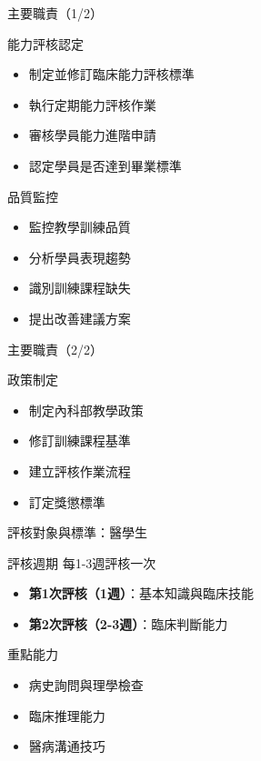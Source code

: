 \documentclass[aspectratio=169,12pt]{beamer}
\begin{document}
\begin{frame}{主要職責（1/2）}
\begin{block}{能力評核認定}
\begin{itemize}
    \item 制定並修訂臨床能力評核標準
    \item 執行定期能力評核作業
    \item 審核學員能力進階申請
    \item 認定學員是否達到畢業標準
\end{itemize}
\end{block}

\begin{block}{品質監控}
\begin{itemize}
    \item 監控教學訓練品質
    \item 分析學員表現趨勢
    \item 識別訓練課程缺失
    \item 提出改善建議方案
\end{itemize}
\end{block}
\end{frame}

\begin{frame}{主要職責（2/2）}
\begin{block}{政策制定}
\begin{itemize}
    \item 制定內科部教學政策
    \item 修訂訓練課程基準
    \item 建立評核作業流程
    \item 訂定獎懲標準
\end{itemize}
\end{block}
\end{frame}

\begin{frame}{評核對象與標準：醫學生}
\begin{block}{評核週期}
每1-3週評核一次
\end{block}

\begin{itemize}
    \item \textbf{第1次評核（1週）}：基本知識與臨床技能
    \item \textbf{第2次評核（2-3週）}：臨床判斷能力
\end{itemize}

\begin{exampleblock}{重點能力}
\begin{itemize}
    \item 病史詢問與理學檢查
    \item 臨床推理能力
    \item 醫病溝通技巧
\end{itemize}
\end{exampleblock}
\end{frame}
\end{document}
